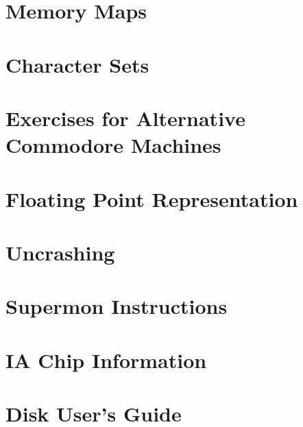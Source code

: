\documentclass[11pt,a4paper,titlepage]{memoir}
\begin{document}
\chapter{Memory Maps}
\blindtext
\chapter{Character Sets}
\blindtext
\chapter{Exercises for Alternative Commodore Machines}
\blindtext
\chapter{Floating Point Representation}
\blindtext
\chapter{Uncrashing}
\blindtext
\chapter{Supermon Instructions}
\blindtext
\chapter{IA Chip Information}
\blindtext
\chapter{Disk User's Guide}
\blindtext
\end{document}

